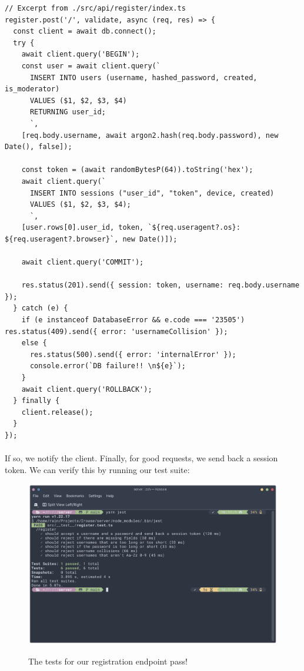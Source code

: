 \documentclass{report}
\begin{document}
\begin{verbatim}
// Excerpt from ./src/api/register/index.ts
register.post('/', validate, async (req, res) => {
  const client = await db.connect();
  try {
    await client.query('BEGIN');
    const user = await client.query(`
      INSERT INTO users (username, hashed_password, created, is_moderator) 
      VALUES ($1, $2, $3, $4) 
      RETURNING user_id;
      `,
    [req.body.username, await argon2.hash(req.body.password), new Date(), false]);

    const token = (await randomBytesP(64)).toString('hex');
    await client.query(`
      INSERT INTO sessions ("user_id", "token", device, created)
      VALUES ($1, $2, $3, $4);
      `,
    [user.rows[0].user_id, token, `${req.useragent?.os}: ${req.useragent?.browser}`, new Date()]);

    await client.query('COMMIT');

    res.status(201).send({ session: token, username: req.body.username });
  } catch (e) {
    if (e instanceof DatabaseError && e.code === '23505') res.status(409).send({ error: 'usernameCollision' });
    else {
      res.status(500).send({ error: 'internalError' });
      console.error(`DB failure!! \n${e}`);
    }
    await client.query('ROLLBACK');
  } finally {
    client.release();
  }
});
\end{verbatim}

\paragraph{}
If so, we notify the client. Finally, for good requests, we send back a session token. We can verify this by running our test suite:

\begin{figure}[h!]
  \includegraphics[width=\linewidth]{./media/development/backend/tests/register/pass.png}
  \label{fig:registerValid1}
  \caption{The tests for our registration endpoint pass!}
\end{figure}
\end{document}
